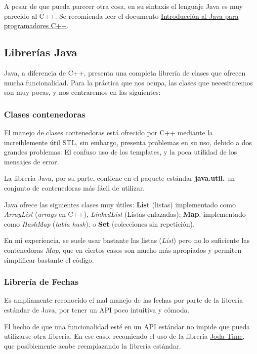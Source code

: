 \documentclass[11pt]{article}
\begin{document}
A pesar de que pueda parecer otra cosa, en su sintaxis el lenguaje Java es muy parecido al C++. Se recomienda
leer el documento \href{http://www.xtec.es/~acastan/textos/Java.pdf}{Introducción al Java para programadores C++}.
\subsection{Librerías Java}
\label{sec-2-2}




Java, a diferencia de C++, presenta una completa librería de clases que ofrecen mucha funcionalidad. Para la
práctica que nos ocupa, las clases que necesitaremos son muy pocas, y nos centraremos en las siguientes:
\subsubsection{Clases contenedoras}
\label{sec-2-2-1}




El manejo de clases contenedoras está ofrecido por C++ mediante la increíblemente útil STL, sin
embargo, presenta problemas en su uso, debido a dos grandes problemas: El confuso uso de los
templates, y la poca utilidad de los mensajes de error.


La librería Java, por su parte, contiene en el paquete estándar \textbf{java.util.\*} un conjunto de
contenedoras más fácil de utilizar.


Java ofrece las siguientes clases muy útiles: \textbf{List} (listas) implementado como 
\emph{ArrayList} (\emph{arrays} en C++), \emph{LinkedList} (Listas enlazadas); \textbf{Map}, implementado como
\emph{HashMap} (\emph{tabla hash}); o \textbf{Set} (colecciones sin repetición). 


En mi experiencia, se suele usar bastante las listas (\emph{List}) pero no lo suficiente las
contenedoras \emph{Map}, que en ciertos casos son mucho más apropiados y permiten simplificar
bastante el código. 
\subsubsection{Librería de Fechas}
\label{sec-2-2-2}




Es ampliamente reconocido el mal manejo de las fechas por parte de la librería estándar de Java, por
tener un API poco intuitiva y cómoda.


El hecho de que una funcionalidad esté en un API estándar no impide que pueda utilizarse otra
librería. En ese caso, recomiendo el uso de la librería \href{http://joda-time.sourceforge.net/}{Joda-Time}, que posiblemente acabe
reemplazando la librería estándar.
\end{document}
